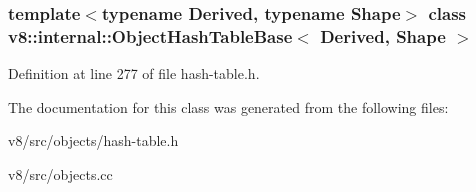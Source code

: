 \subsubsection*{template$<$typename Derived, typename Shape$>$\newline
class v8\+::internal\+::\+Object\+Hash\+Table\+Base$<$ Derived, Shape $>$}



Definition at line 277 of file hash-\/table.\+h.



The documentation for this class was generated from the following files\+:\begin{DoxyCompactItemize}
\item 
v8/src/objects/hash-\/table.\+h\item 
v8/src/objects.\+cc\end{DoxyCompactItemize}
